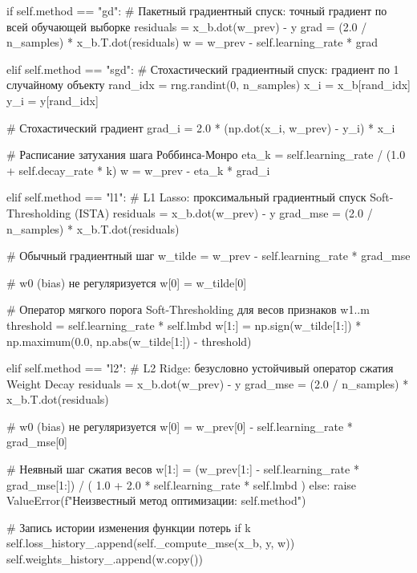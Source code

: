 \documentclass[14pt,a4paper]{extarticle}
\begin{document}
\begin{CodeListing}
            if self.method == "gd":
                # Пакетный градиентный спуск: точный градиент по всей обучающей выборке
                residuals = x_b.dot(w_prev) - y
                grad = (2.0 / n_samples) * x_b.T.dot(residuals)
                w = w_prev - self.learning_rate * grad

            elif self.method == "sgd":
                # Стохастический градиентный спуск: градиент по 1 случайному объекту
                rand_idx = rng.randint(0, n_samples)
                x_i = x_b[rand_idx]
                y_i = y[rand_idx]

                # Стохастический градиент
                grad_i = 2.0 * (np.dot(x_i, w_prev) - y_i) * x_i

                # Расписание затухания шага Роббинса-Монро
                eta_k = self.learning_rate / (1.0 + self.decay_rate * k)
                w = w_prev - eta_k * grad_i

            elif self.method == "l1":
                # L1 Lasso: проксимальный градиентный спуск Soft-Thresholding (ISTA)
                residuals = x_b.dot(w_prev) - y
                grad_mse = (2.0 / n_samples) * x_b.T.dot(residuals)

                # Обычный градиентный шаг
                w_tilde = w_prev - self.learning_rate * grad_mse

                # w0 (bias) не регуляризуется
                w[0] = w_tilde[0]

                # Оператор мягкого порога Soft-Thresholding для весов признаков w1..m
                threshold = self.learning_rate * self.lmbd
                w[1:] = np.sign(w_tilde[1:]) * np.maximum(0.0, np.abs(w_tilde[1:]) - threshold)

            elif self.method == "l2":
                # L2 Ridge: безусловно устойчивый оператор сжатия Weight Decay
                residuals = x_b.dot(w_prev) - y
                grad_mse = (2.0 / n_samples) * x_b.T.dot(residuals)

                # w0 (bias) не регуляризуется
                w[0] = w_prev[0] - self.learning_rate * grad_mse[0]

                # Неявный шаг сжатия весов
                w[1:] = (w_prev[1:] - self.learning_rate * grad_mse[1:]) / (
                    1.0 + 2.0 * self.learning_rate * self.lmbd
                )
            else:
                raise ValueError(f"Неизвестный метод оптимизации: {self.method}")

            # Запись истории изменения функции потерь
            if k %
                self.loss_history_.append(self._compute_mse(x_b, y, w))
                self.weights_history_.append(w.copy())


\end{CodeListing}
\end{document}
